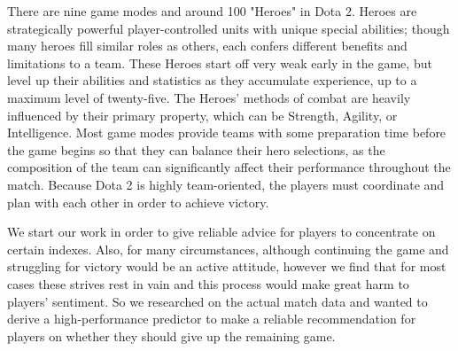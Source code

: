 \documentclass[a4paper, 11pt]{article} %
\begin{document}
There are nine game modes and around 100 "Heroes" in Dota 2. Heroes are strategically powerful player-controlled units with unique special abilities; though many heroes fill similar roles as others, each confers different benefits and limitations to a team. These Heroes start off very weak early in the game, but level up their abilities and statistics as they accumulate experience, up to a maximum level of twenty-five. The Heroes' methods of combat are heavily influenced by their primary property, which can be Strength, Agility, or Intelligence. Most game modes provide teams with some preparation time before the game begins so that they can balance their hero selections, as the composition of the team can significantly affect their performance throughout the match. Because Dota 2 is highly team-oriented, the players must coordinate and plan with each other in order to achieve victory.\cite{dota2}

We start our work in order to give reliable advice for players to concentrate on certain indexes. Also, for many circumstances, although continuing the game and struggling for victory would be an active attitude, however we find that for most cases these strives rest in vain and this process would make great harm to players' sentiment. So we researched on the actual match data and wanted to derive a high-performance predictor to make a reliable recommendation for players on whether they should give up the remaining game.
\end{document}
